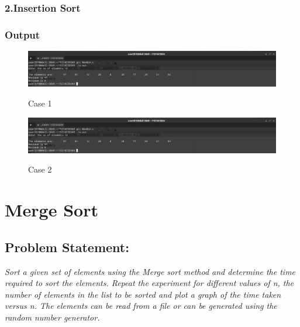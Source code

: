 \documentclass[12pt, a4paper]{article}
\begin{document}
\subsubsection*{2.Insertion Sort}

\subsubsection*{Output}
\begin{figure}[h]
\centering
\includegraphics[width=5 in,height=2 in]{./Output/im1.png}
\label{Figure 2}
\caption{Case 1}
\end{figure}
\begin{figure}[h]
\centering
\includegraphics[width=5 in,height=2 in]{./Output/im2.png}
\label{Figure 3}
\caption{Case 2}
\end{figure}

\section{Merge Sort}\subsection*{Problem Statement:}\par\textit{Sort a given set of elements using the Merge sort method and determine the time
required to sort the elements. Repeat the experiment for different values of n, the
number of elements in the list to be sorted and plot a graph of the time taken
versus n. The elements can be read from a file or can be generated using the
random number generator.}
\end{document}
